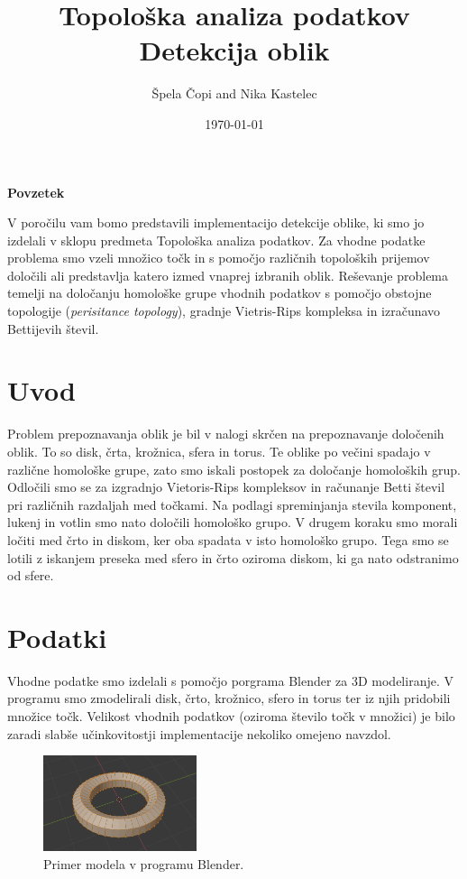 \documentclass[a4paper,11pt]{article}
\title{ Topološka analiza podatkov \\ Detekcija oblik}
\author{Špela Čopi and Nika Kastelec }
\date{\today}
\begin{document}
\maketitle

\begin{center}
\textbf{Povzetek}
\end{center}

\begin{center}

V poročilu vam bomo predstavili implementacijo detekcije oblike, ki smo jo izdelali v sklopu predmeta Topološka analiza podatkov. Za vhodne podatke problema smo vzeli množico točk in s pomočjo različnih topoloških prijemov določili ali predstavlja katero izmed vnaprej izbranih oblik. Reševanje problema temelji na določanju homološke grupe vhodnih podatkov s pomočjo obstojne topologije (\textit{perisitance topology}), gradnje Vietris-Rips kompleksa in izračunavo Bettijevih števil.

\end{center}


\section{Uvod}

Problem prepoznavanja oblik je bil v nalogi skrčen na prepoznavanje določenih oblik. To so disk, črta, krožnica, sfera in torus. Te oblike po večini spadajo v različne homološke grupe, zato smo iskali postopek za določanje homoloških grup. Odločili smo se za izgradnjo Vietoris-Rips kompleksov in računanje Betti števil pri različnih razdaljah med točkami. Na podlagi spreminjanja stevila komponent, lukenj in votlin smo nato določili homološko grupo. 
V drugem koraku smo morali ločiti med črto in diskom, ker oba spadata v isto homološko grupo. Tega smo se lotili z iskanjem preseka med sfero in črto oziroma diskom, ki ga nato odstranimo od sfere. 

\section{Podatki}

Vhodne podatke smo izdelali s pomočjo porgrama Blender za 3D modeliranje. V programu smo zmodelirali disk, črto, krožnico, sfero in torus ter iz njih pridobili množice točk. Velikost vhodnih podatkov (oziroma število točk v množici) je bilo zaradi slabše učinkovitostji implementacije nekoliko omejeno navzdol. 

\begin{figure}[h]
\centering
\includegraphics[width=0.4\textwidth]{blender_torus}
\caption{Primer modela v programu Blender.}
\end{figure}
  
\end{document}
